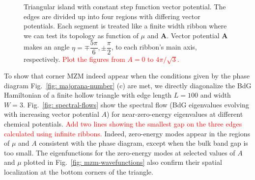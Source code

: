\documentclass[aps,prb,showpacs,amsmath,twocolumn,amssymb,superscriptaddress]{revtex4-2}
\newcommand{\Red}[1]{\textcolor{red}{#1}}
\renewcommand{\vec}[1]{\mathbf{#1}}
\begin{document}
\begin{figure}[]
  \caption{Triangular island with constant step function vector potential. The edges are divided up into four regions with differing vector potentials. Each segment is treated like a finite width ribbon where we can test its topology as function of $\mu$ and $\vec{A}$. Vector potential $\vec{A}$ makes an angle $\eta =  \mp \dfrac{5\pi}{6}, \pm \dfrac{\pi}{2}$, to each ribbon's main axis, respectively. \Red{Plot the figures from $A=0$ to $4\pi/\sqrt{3}$.}}
  \label{fig: triangular-island-vector-potential-divided}
\end{figure}

To show that corner MZM indeed appear when the conditions given by the phase diagram Fig.~\ref{fig: majorana-number} (c) are met, we directly diagonalize the BdG Hamiltonian of a finite hollow triangle with edge length $L=100$ and width $W=3$. Fig.~\ref{fig: spectral-flows} show the spectral flow (BdG eigenvalues evolving with increasing vector potential $A$) for near-zero-energy eigenvalues at different chemical potentials. \Red{Add two lines showing the smallest gap on the three edges calculated using infinite ribbons.} Indeed, zero-energy modes appear in the regions of $\mu$ and $A$ consistent with the phase diagram, except when the bulk band gap is too small. The eigenfunctions for the zero-energy modes at selected values of $A$ and $\mu$ plotted in Fig.~\ref{fig: mzm-wavefunctions} also confirm their spatial localization at the bottom corners of the triangle. 
\end{document}
